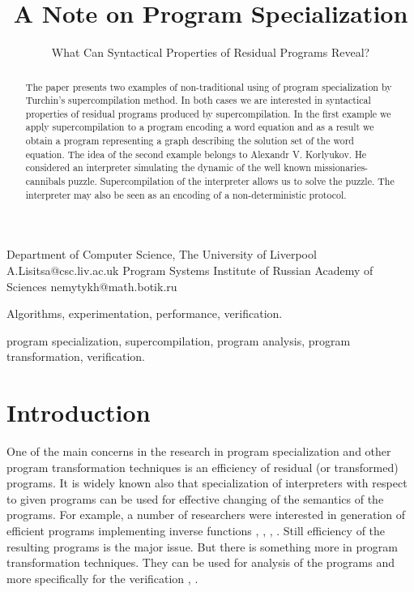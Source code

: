 \documentclass[preprint]{sigplanconf}
\begin{document}
\copyrightdata{[to be supplied]} 


\title{A Note on Program Specialization
}
\subtitle{ What Can Syntactical Properties of Residual Programs  Reveal? }

           {{Department of Computer Science, The University of Liverpool}}
           {{A.Lisitsa@csc.liv.ac.uk}}
           {Program Systems Institute of Russian Academy of Sciences}
           {{nemytykh@math.botik.ru}}

\maketitle


\begin{abstract}
The paper presents two examples of non-traditional using of program specialization by Turchin's supercompilation method. 
In both cases we are interested in syntactical properties of residual programs produced by supercompilation. 
In the first example we apply supercompilation to a program encoding a word equation and as a result we obtain a program  representing a graph 
describing the solution set of the word equation. 
The idea of the second example belongs to Alexandr V. Korlyukov. He considered an interpreter simulating the dynamic of the well known missionaries-cannibals puzzle. Supercompilation of the interpreter allows us to solve the puzzle. 
The interpreter may also be seen as an encoding of a non-deterministic protocol.
\end{abstract}


\terms
Algorithms, experimentation, performance, verification. 

\keywords
program specialization, supercompilation, program analysis, program transformation, verification.

\section{Introduction}\label{Introduction}


One of the main concerns in the research in program specialization and other program transformation techniques is an efficiency of residual (or transformed) programs.    It is widely known also that specialization of interpreters with respect to given programs can be used for effective changing of the semantics of the programs. For example, a number of researchers were interested in generation of efficient programs implementing inverse functions 
\cite{AYuRomanenko:88}, \cite{AYuRomanenko:91}, \cite{Turchin:JFP93}, \cite{Glueck:Inverse03}. 
Still 
efficiency of the resulting programs is the major issue. 
But there is something more in program transformation techniques.  
They can be used for analysis of the programs and more specifically for the verification \cite{Leuschel:99}, \cite{Lis_Nem:IJFCS08}.
\end{document}
